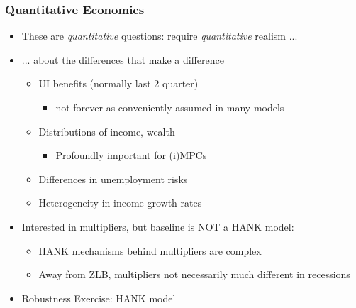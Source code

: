 \documentclass[pdflatex,aspectratio=169]{beamer}
\begin{document}
\begin{frame}
  \frametitle{Quantitative Economics}
  \begin{itemize}[<+->]
    \itemsep = .75\bigskipamount
    \item
          These are \textit{quantitative} questions: require \textit{quantitative} realism ...
    \item
          ... about the differences that make a difference
          \begin{itemize}[<+->]
            \itemsep = .25\bigskipamount
            \item
                  UI benefits (normally last 2 quarter)
                  \begin{itemize}
                    \item
                          not forever as conveniently assumed in many models
                  \end{itemize}
            \item
                  Distributions of income, wealth
                  \begin{itemize}
                    \item
                          Profoundly important for (i)MPCs
                  \end{itemize}
            \item
                  Differences in unemployment risks
            \item
                  Heterogeneity in income growth rates
          \end{itemize}
  \end{itemize}


  \begin{itemize}[<+->]
    \item
          Interested in multipliers, but baseline is NOT a HANK model:
          \begin{itemize}[<+->]
            \itemsep = .25\bigskipamount
            \item
                  HANK mechanisms behind multipliers are complex
            \item
                  Away from ZLB, multipliers not necessarily much different in recessions
          \end{itemize}
  \end{itemize}

  \begin{itemize}[<+->]
    \itemsep = .25\bigskipamount
    \item
          Robustness Exercise: HANK model
  \end{itemize}
\end{frame}
\end{document}
